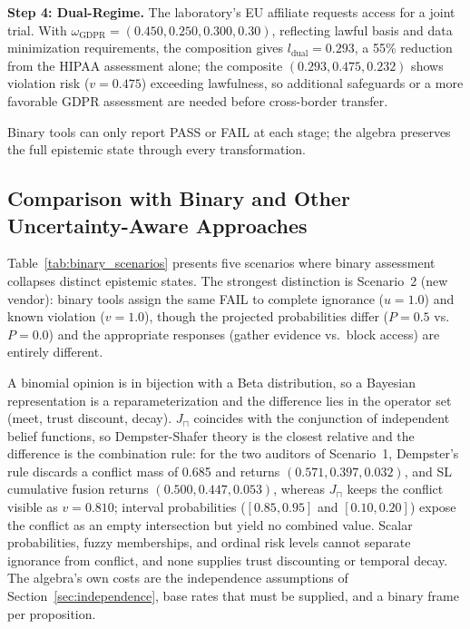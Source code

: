 \documentclass[conference]{IEEEtran}
\begin{document}
\textbf{Step 4: Dual-Regime.} The laboratory's EU affiliate requests
access for a joint trial. With
$\omega_{\text{GDPR}} = (0.450, 0.250, 0.300, 0.30)$, reflecting lawful
basis and data minimization requirements, the composition gives
$l_{\text{dual}} = 0.293$, a 55\% reduction from the HIPAA assessment
alone; the composite $(0.293, 0.475, 0.232)$ shows violation risk
($v = 0.475$) exceeding lawfulness, so additional safeguards or a more
favorable GDPR assessment are needed before cross-border transfer.

Binary tools can only report PASS or FAIL at each stage; the algebra
preserves the full epistemic state through every transformation.

\subsection{Comparison with Binary and Other Uncertainty-Aware Approaches}

Table~\ref{tab:binary_scenarios} presents five scenarios where binary assessment collapses distinct epistemic states. The strongest distinction is Scenario~2 (new vendor): binary tools assign the same FAIL to complete ignorance ($u = 1.0$) and known violation ($v = 1.0$), though the projected probabilities differ ($P = 0.5$ vs.\ $P = 0.0$) and the appropriate responses (gather evidence vs.\ block access) are entirely different.

A binomial opinion is in bijection with a Beta distribution, so a Bayesian representation is a reparameterization and the difference lies in the operator set (meet, trust discount, decay). $J_\sqcap$ coincides with the conjunction of independent belief functions, so Dempster-Shafer theory is the closest relative and the difference is the combination rule: for the two auditors of Scenario~1, Dempster's rule discards a conflict mass of 0.685 and returns $(0.571, 0.397, 0.032)$, and SL cumulative fusion returns $(0.500, 0.447, 0.053)$, whereas $J_\sqcap$ keeps the conflict visible as $v = 0.810$; interval probabilities ($[0.85, 0.95]$ and $[0.10, 0.20]$) expose the conflict as an empty intersection but yield no combined value. Scalar probabilities, fuzzy memberships, and ordinal risk levels cannot separate ignorance from conflict, and none supplies trust discounting or temporal decay. The algebra's own costs are the independence assumptions of Section~\ref{sec:independence}, base rates that must be supplied, and a binary frame per proposition.


\end{document}
